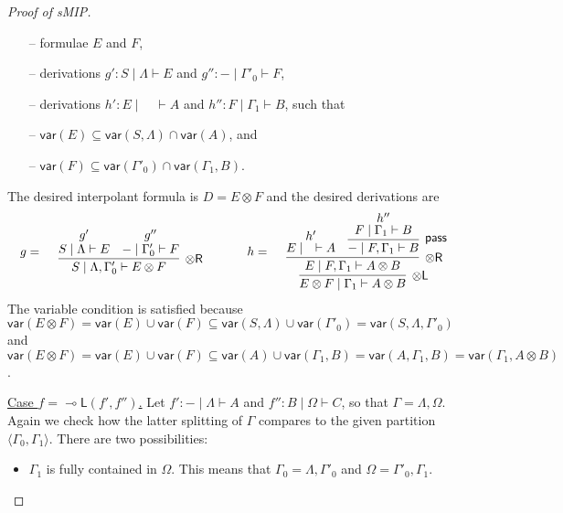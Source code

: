 \documentclass[sn-mathphys-num]{sn-jnl}%
\newcommand{\GG}{\Gamma}
\newcommand{\GL}{\Lambda}
\newcommand{\GO}{\Omega}
\newcommand{\vd}{\vdash}
\newcommand{\tl}{\otimes \mathsf{L}}
\newcommand{\tr}{\otimes\mathsf{R}}
\newcommand{\pass}{\mathsf{pass}}
\newcommand{\ot}{\otimes}
\newcommand{\lolli}{\multimap}
\newcommand{\lleft}{{\lolli}\mathsf{L}}
\newcommand{\proofbox}[1]{\begin{tabular}{l} #1 \end{tabular}}
\newcommand{\mf}[1]{\mathsf{#1}}
\newcommand{\vars}[1]{\mf{var} (#1)}
\newcommand{\sMIP}{\textsf{sMIP}}
\theoremstyle{thmstyleone}%
\theoremstyle{thmstyletwo}%
\theoremstyle{thmstylethree}%
\begin{document}
\begin{proof}[Proof of \sMIP]
\begin{itemize}
    \begin{itemize}
      \item[--] formulae $E$ and $F$,
      \item[--] derivations $g' : S \mid \GL \vd E$ and $g'' : {-} \mid \GG'_0 \vd F$,
      \item[--] derivations $h' : E \mid \quad \vd A$ and $h'' : F \mid \GG_1 \vd B$, such that
      \item[--] $\vars{E} \subseteq \vars{S, \GL} \cap \vars{A}$, and
      \item[--] $\vars{F} \subseteq \vars{\GG'_0} \cap \vars{\GG_1, B}$.
    \end{itemize}
    The desired interpolant formula is $D = E \ot F$ and the desired derivations are
    \begin{displaymath}
      \begin{array}{c}
        \begin{array}{c}
          g
          =
          \proofbox{\infer[\tr]{S \mid \GL , \GG'_0 \vd E \ot F}{
          \deduce{S \mid \GL \vd E}{g'}
          &
          \deduce{{-} \mid \GG'_0 \vd F}{g''}
          }}
        \end{array}
        \qquad
        \begin{array}{c}
          h
          =
          \proofbox{\infer[\tl]{E \ot F \mid \GG_1 \vd A \ot B}{
          \infer[\tr]{E \mid F , \GG_1 \vd A \ot B}{
          \deduce{E \mid \quad \vd A}{h'}
          &
          \infer[\pass]{{-} \mid F , \GG_1 \vd B}{
          \deduce{F \mid \GG_1 \vd B}{h''}
          }
          }
          }}
        \end{array}
      \end{array}
    \end{displaymath}
    The variable condition is satisfied because $\vars{E \ot F} = \vars{E} \cup \vars{F} \subseteq \vars{S , \GL} \cup \vars{\GG'_0} = \vars{S, \GL , \GG'_0}$ and $\vars{E \ot F} = \vars{E} \cup \vars{F} \subseteq \vars{A} \cup \vars{\GG_1 , B} = \vars{A, \GG_1 , B} = \vars{\GG_1, A \ot B}$.
  \end{itemize}
  \underline{Case $f = \lleft(f',f'')$.}
  Let $f' : {-} \mid \GL \vd A$ and $f'' : B \mid \GO \vd C$, so that $\GG = \GL,\GO$. 
  Again we check how the latter splitting of $\GG$ compares to the given partition $\langle \GG_0,\GG_1 \rangle$. 
  There are two possibilities:
  \begin{itemize}
    \item  $\GG_1$ is fully contained in $\GO$. 
    This means that $\GG_0 = \GL,\GG'_0$ and $\GO = \GG'_0,\GG_1$.

\end{itemize}
\end{proof}
\end{document}
